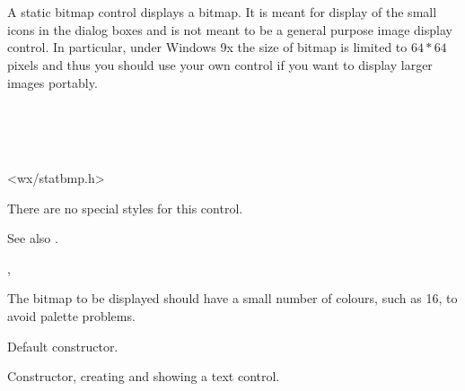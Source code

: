 \section{}\label{wxstaticbitmap}

A static bitmap control displays a bitmap. It is meant for display of the
small icons in the dialog boxes and is not meant to be a general purpose image
display control. In particular, under Windows 9x the size of bitmap is limited
to $64*64$ pixels and thus you should use your own control if you want to
display larger images portably.


\\
\\
\\


<wx/statbmp.h>




There are no special styles for this control.

See also .


, 


The bitmap to be displayed should have a small number of colours, such as 16, to avoid
palette problems.



\label{wxstaticbitmapconstr}


Default constructor.


Constructor, creating and showing a text control.

